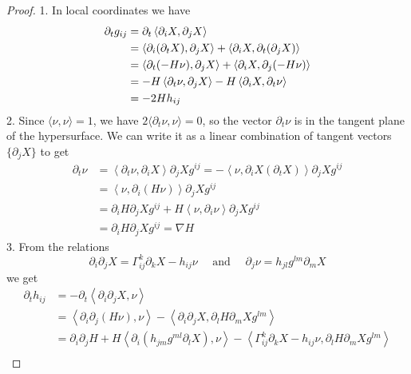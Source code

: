 \begin{proof}
1. In local coordinates we have 
\begin{align*}
    \partial_tg_{ij} & = \partial_{t} \left\langle \partial_{i}X, \partial_{j}X \right\rangle \\
& = \left\langle \partial_{i}(\partial_{t}X), \partial_{j}X \right\rangle + \left\langle \partial_{i}X, \partial_{t}(\partial_{j}X) \right\rangle\\
& = \left\langle \partial_{t}(-H \nu), \partial_{j}X \right\rangle + \left\langle \partial_{i}X, \partial_{j}(-H \nu)\right\rangle \\
& = -H \left\langle \partial_{t} \nu, \partial_{j}X\right\rangle  - H \left\langle \partial_{i}X, \partial_{t}\nu\right\rangle \\
& = -2Hh_{ij}
\end{align*}
2. Since $\langle \nu, \nu \rangle = 1$, we have $2\langle \partial_{t}\nu, \nu \rangle = 0$, so the vector $\partial_{t}\nu$ is in the tangent plane of the hypersurface. We can write it as a linear combination of tangent vectors $\{\partial_{j}X\}$ to get
\begin{align*}
\partial_{t}\nu &= \left\langle \partial_{t}\nu, \partial_{i}X \right\rangle \partial_{j}Xg^{ij} = - \left\langle \nu, \partial_{i}X\left( \partial_{t}X \right) \right\rangle\partial_{j}X g^{ij} \\
& = \left\langle \nu, \partial_{i}\left( H \nu \right) \right\rangle \partial_{j}Xg^{ij}\\
& = \partial_{i}H \partial_{j}X g^{ij} + H \left\langle \nu, \partial_{i}\nu\right\rangle \partial_{j}Xg^{ij}\\
& = \partial_{i}H\partial_{j}Xg^{ij} = \nabla H
\end{align*}
3. From the relations \[
\partial_{i}\partial_{j}X = \Gamma^{k}_{ij}\partial_{k}X	-h_{ij}\nu \quad \text{ and } \quad\partial_{j}\nu = h_{jl}g^{lm}\partial_{m}X\] we get 
\begin{align*}
\partial_{t} h_{ij} & = - \partial_{t} \left\langle\partial_{i}\partial_{j}X ,\nu\right\rangle\\
& = \left\langle\partial_{i}\partial_{j}(H \nu), \nu \right\rangle - \left\langle \partial_{i}\partial_{j}X, \partial_{l}H \partial_{m}Xg^{lm}\right\rangle \\
& = \partial_{i}\partial_{j}H + H \left\langle \partial_{i}\left( h_{jm}g^{ml} \partial_{l}X \right), \nu \right\rangle -\left< \Gamma_{ij}^{k}\partial_{k}X-h_{ij}\nu,\partial_{l}H \partial_{m}Xg^{lm} \right>\\

\end{align*}
\end{proof}
